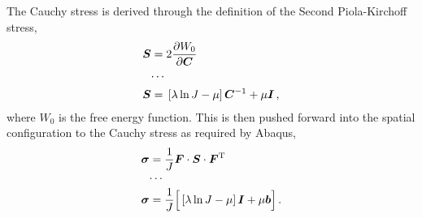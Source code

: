 \documentclass[10pt,letterpaper,oneside]{report}
\newcommand{\ten}[1]{\mbox{\boldmath $#1$}{}}
\newcommand{\scas}[1]{\mbox{{\scriptsize{${\rm{#1}}$}}}{}}
\begin{document}
The Cauchy stress is derived through the definition of the Second Piola-Kirchoff stress,
\begin{align}
\ten{S} ={}& 2 \frac{\partial W_0}{\partial \ten{C}}  
\\
\cdots{}& \notag \\
\ten{S} ={}& \left[ \lambda \ln J - \mu \right] \ten{C}^{-1} + \mu \ten{I} \, , 
\end{align}
where $W_0$ is the free energy function.  This is then pushed forward into the spatial configuration to the Cauchy stress as required by Abaqus, 
\begin{align}
\ten{\sigma} ={}& \frac{1}{J} \ten{F} \cdot \ten{S} \cdot \ten{F}^{\scas{T}} 
\\
\cdots{}& \notag \\
\ten{\sigma} ={}& \frac{1}{J} \Big[ \left[ \lambda \ln J - \mu \right] \ten{I} + \mu \ten{b} \Big] \, . 
\end{align}
\end{document}
